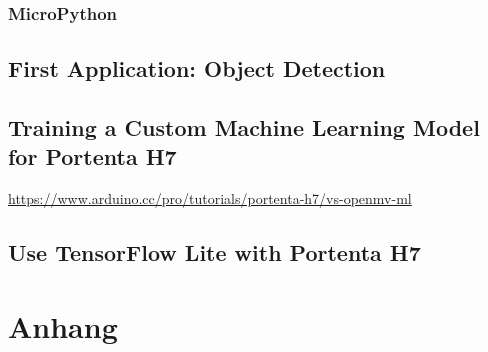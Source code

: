 \documentclass[10pt,a4paper,bibliography=totoc]{scrbook}
\begin{document}
\section{MicroPython}



\chapter{First Application: Object Detection}

\chapter{Training a Custom Machine Learning Model for Portenta H7}

\url{https://www.arduino.cc/pro/tutorials/portenta-h7/vs-openmv-ml}

\chapter{Use TensorFlow Lite with Portenta H7}




\part{Anhang}



{





}


\printbibliography[
heading=bibintoc,
title={Literaturverzeichnis}
]


\newpage

\printindex



%
\end{document}
